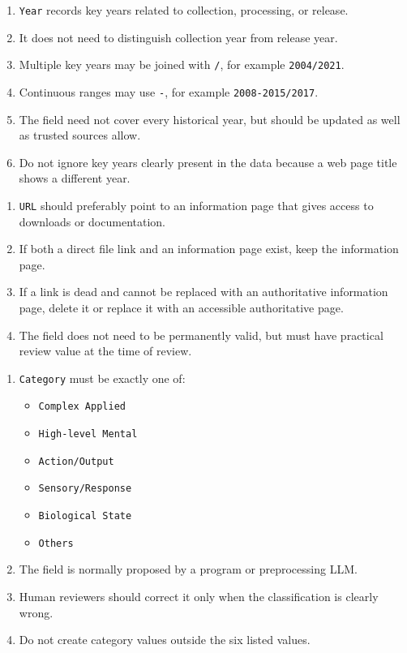\begin{tcolorbox}
\begin{enumerate}[leftmargin=1.5em,noitemsep,topsep=2pt]
\item \texttt{Year} records key years related to collection, processing, or release.
\item It does not need to distinguish collection year from release year.
\item Multiple key years may be joined with \texttt{/}, for example \texttt{2004/2021}.
\item Continuous ranges may use \texttt{-}, for example \texttt{2008-2015/2017}.
\item The field need not cover every historical year, but should be updated as well as trusted sources allow.
\item Do not ignore key years clearly present in the data because a web page title shows a different year.
\end{enumerate}

\smallskip{}\par\smallskip

\begin{enumerate}[leftmargin=1.5em,noitemsep,topsep=2pt]
\item \texttt{URL} should preferably point to an information page that gives access to downloads or documentation.
\item If both a direct file link and an information page exist, keep the information page.
\item If a link is dead and cannot be replaced with an authoritative information page, delete it or replace it with an accessible authoritative page.
\item The field does not need to be permanently valid, but must have practical review value at the time of review.
\end{enumerate}

\smallskip{}\par\smallskip

\begin{enumerate}[leftmargin=1.5em,noitemsep,topsep=2pt]
\item \texttt{Category} must be exactly one of:
\begin{itemize}[leftmargin=1.2em,noitemsep,topsep=1pt]
\item \texttt{Complex Applied}
\item \texttt{High-level Mental}
\item \texttt{Action/Output}
\item \texttt{Sensory/Response}
\item \texttt{Biological State}
\item \texttt{Others}
\end{itemize}
\item The field is normally proposed by a program or preprocessing LLM.
\item Human reviewers should correct it only when the classification is clearly wrong.
\item Do not create category values outside the six listed values.
\end{enumerate}


\end{tcolorbox}
